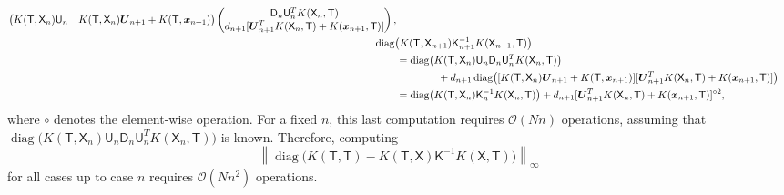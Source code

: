 \documentclass[]{mcom-l}
\theoremstyle{remark}
\DeclareMathOperator{\diag}{diag}
\newcommand{\mD}{\mathsf{D}}
\newcommand{\mK}{\mathsf{K}}
\newcommand{\mT}{\mathsf{T}}
\newcommand{\mU}{\mathsf{U}}
\newcommand{\mX}{\mathsf{X}}
\newcommand{\bx}{{\boldsymbol{x}}}
\newcommand{\bU}{{\boldsymbol{U}}}
\newcommand{\norm}[2][{}]{\ensuremath{\left \lVert #2 \right \rVert}_{#1}}
\newcommand{\Order}{\mathcal{O}}
\begin{document}
\begin{align*}
\begin{pmatrix}
K(\mT, \mX_n)\mU_n  &
K(\mT, \mX_n)\bU_{n+1} +  K(\mT, \bx_{n+1})
\end{pmatrix} 
\begin{pmatrix}
\mD_n\mU_n^T  K(\mX_n,\mT) \\
d_{n+1}[ \bU_{n+1}^T K(\mX_n,\mT) + K(\bx_{n+1},\mT) ]
\end{pmatrix}, \\
\MoveEqLeft{\diag\bigl( K(\mT,\mX_{n+1}) \mK_{n+1}^{-1} K(\mX_{n+1},\mT) \bigr)} \\
& = \diag\bigl( K(\mT, \mX_n)\mU_n \mD_n\mU_n^T  K(\mX_n,\mT) \bigr) \\
&\qquad \qquad + 
d_{n+1} \diag\bigl( [K(\mT, \mX_n)\bU_{n+1} +  K(\mT, \bx_{n+1})] [ \bU_{n+1}^T K(\mX_n,\mT) + K(\bx_{n+1},\mT) ] \bigr) \\
& = \diag\bigl( K(\mT, \mX_n)\mK_n^{-1}  K(\mX_n,\mT) \bigr)  + 
d_{n+1} [ \bU_{n+1}^T K(\mX_n,\mT) + K(\bx_{n+1},\mT) ]^{\circ 2},
\end{align*}
where $\circ$ denotes the element-wise operation.  For a fixed $n$, this last computation requires $\Order(Nn)$ operations, assuming that $\diag\bigl( K(\mT, \mX_n)\mU_n \mD_n\mU_n^T  K(\mX_n,\mT) \bigr)$ is known.  Therefore, computing 
\begin{equation*}
 \norm[\infty]{\diag\bigl(K(\mT,\mT) - K(\mT,\mX) \mK^{-1} K(\mX,\mT) \bigr)}
\end{equation*}
for all cases up to case $n$ requires $\Order(Nn^2)$ operations.
\end{document}
